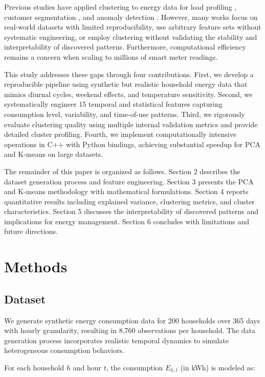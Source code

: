 \documentclass[11pt]{article}
\begin{document}
Previous studies have applied clustering to energy data for load profiling \cite{chicco2012overview}, customer segmentation \cite{kwac2014household}, and anomaly detection \cite{zheng2018wide}. However, many works focus on real-world datasets with limited reproducibility, use arbitrary feature sets without systematic engineering, or employ clustering without validating the stability and interpretability of discovered patterns. Furthermore, computational efficiency remains a concern when scaling to millions of smart meter readings.

This study addresses these gaps through four contributions. First, we develop a reproducible pipeline using synthetic but realistic household energy data that mimics diurnal cycles, weekend effects, and temperature sensitivity. Second, we systematically engineer 15 temporal and statistical features capturing consumption level, variability, and time-of-use patterns. Third, we rigorously evaluate clustering quality using multiple internal validation metrics and provide detailed cluster profiling. Fourth, we implement computationally intensive operations in C++ with Python bindings, achieving substantial speedup for PCA and K-means on large datasets.

The remainder of this paper is organized as follows. Section 2 describes the dataset generation process and feature engineering. Section 3 presents the PCA and K-means methodology with mathematical formulations. Section 4 reports quantitative results including explained variance, clustering metrics, and cluster characteristics. Section 5 discusses the interpretability of discovered patterns and implications for energy management. Section 6 concludes with limitations and future directions.

\section{Methods}

\subsection{Dataset}

We generate synthetic energy consumption data for 200 households over 365 days with hourly granularity, resulting in 8,760 observations per household. The data generation process incorporates realistic temporal dynamics to simulate heterogeneous consumption behaviors.

For each household $h$ and hour $t$, the consumption $E_{h,t}$ (in kWh) is modeled as:
\end{document}
